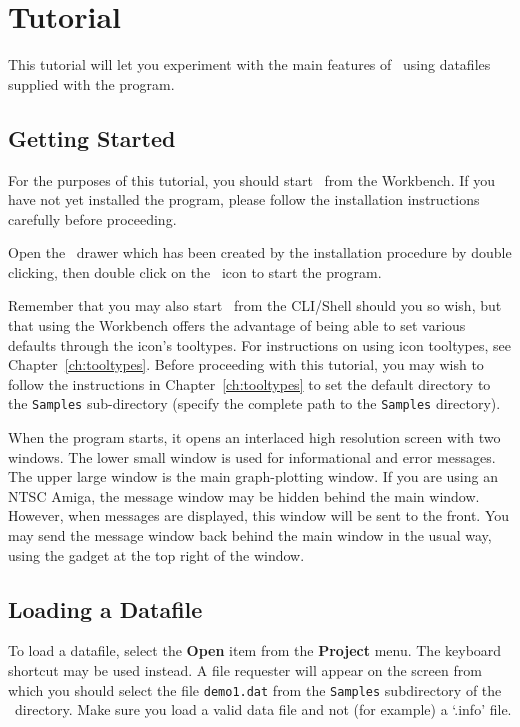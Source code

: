 
\chapter{Tutorial}
This tutorial will let you experiment with the main features of \amplot\ using 
datafiles supplied with the program.

\section{Getting Started}
For the purposes of this tutorial, you should start \amplot\ from the Workbench. 
If you have not yet installed the program, please follow the installation 
instructions carefully before proceeding.

Open the \amplot\ drawer which has been created by the installation procedure by 
double clicking, then double click on the \amplot\ icon to start the program.

Remember that you may also start \amplot\ from the CLI/Shell should you so wish, but 
that using the Workbench offers the advantage of being able to set various defaults 
through the icon's tooltypes. For instructions on using icon tooltypes, see 
Chapter~\ref{ch:tooltypes}. Before proceeding with this tutorial, you may wish to 
follow the instructions in Chapter~\ref{ch:tooltypes} to set the default directory 
to the {\tt Samples} sub-directory (specify the complete path to the {\tt Samples} 
directory).

When the program starts, it opens an interlaced high resolution screen with two windows. 
The lower small window is used for informational and error messages.
The upper large window is the main graph-plotting window.
If you are using an NTSC Amiga, the message window may be hidden behind the main 
window. However, when messages are displayed, this window will be sent to the front. 
You may send the message window back behind the main window in the usual way, using
the gadget at the top right of the window.






\section{Loading a Datafile}
To load a datafile,
select the {\bf Open} item from the {\bf Project} menu. The
keyboard shortcut  may be used instead. A 
file requester will appear on the screen from which you should select the file 
{\tt demo1.dat} from the {\tt Samples} subdirectory of the \amplot\ directory.
Make sure you load a valid data file and not (for example) a `.info' file.

